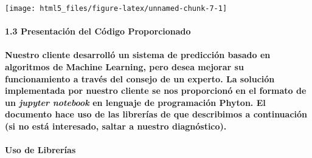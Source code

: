\documentclass[]{article}
\let\oldparagraph\paragraph
\renewcommand{\paragraph}[1]{\oldparagraph{#1}\mbox{}}
\begin{document}
\begin{center}\texttt{[image: html5\_files/figure-latex/unnamed-chunk-7-1]} \end{center}

\paragraph{1.3 Presentación del Código
Proporcionado}\label{presentacion-del-codigo-proporcionado}

\paragraph{\texorpdfstring{Nuestro cliente desarrolló un sistema de
predicción basado en algoritmos de Machine Learning, pero desea mejorar
su funcionamiento a través del consejo de un experto. La solución
implementada por nuestro cliente se nos proporcionó en el formato de un
\textbf{\emph{jupyter notebook}} en lenguaje de programación
\textbf{Phyton}. El documento hace uso de las librerías de que
describimos a continuación (si no está interesado, saltar a nuestro
diagnóstico).}{Nuestro cliente desarrolló un sistema de predicción basado en algoritmos de Machine Learning, pero desea mejorar su funcionamiento a través del consejo de un experto. La solución implementada por nuestro cliente se nos proporcionó en el formato de un jupyter notebook en lenguaje de programación Phyton. El documento hace uso de las librerías de que describimos a continuación (si no está interesado, saltar a nuestro diagnóstico).}}\label{nuestro-cliente-desarrollo-un-sistema-de-prediccion-basado-en-algoritmos-de-machine-learning-pero-desea-mejorar-su-funcionamiento-a-traves-del-consejo-de-un-experto.-la-solucion-implementada-por-nuestro-cliente-se-nos-proporciono-en-el-formato-de-un-jupyter-notebook-en-lenguaje-de-programacion-phyton.-el-documento-hace-uso-de-las-librerias-de-que-describimos-a-continuacion-si-no-esta-interesado-saltar-a-nuestro-diagnostico.}

\paragraph{Uso de Librerías}\label{uso-de-librerias}
\end{document}
